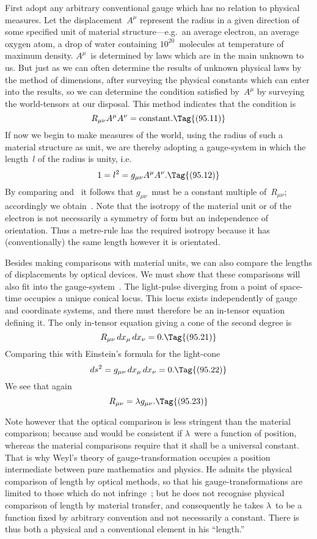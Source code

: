 \documentclass[12pt]{book}
\begin{document}
First adopt any arbitrary conventional gauge which has no relation to
%
%
physical measures. Let the displacement~$A^{\mu}$ represent the radius in a given
direction of some specified unit of material structure---e.g.\ an average electron,
an average oxygen atom, a drop of water containing $10^{20}$~molecules at temperature
of maximum density. $A^{\mu}$~is determined by laws which are in the main
unknown to us. But just as we can often determine the results of unknown
physical laws by the method of dimensions, after surveying the physical
constants which can enter into the results, so we can determine the condition
satisfied by~$A^{\mu}$ by surveying the world-tensors at our disposal. This method
indicates that the condition is
\[
R_{\mu\nu} A^{\mu} A^{\nu} = \text{constant}.
\Tag{(95.11)}
\]
If now we begin to make measures of the world, using the radius of such a
material structure as unit, we are thereby adopting a gauge-system in which
the length~$l$ of the radius is unity, i.e.\
\[
1 = l^{2} = g_{\mu\nu} A^{\mu} A^{\nu}.
\Tag{(95.12)}
\]
By comparing  and~ it follows that $g_{\mu\nu}$~must be a constant
multiple of~$R_{\mu\nu}$; accordingly we obtain~\Eq{(95.1)}\footnotemark.\footnotetext
  {Note that the isotropy of the material unit or of the electron is not necessarily a symmetry
  of form but an independence of orientation. Thus a metre-rule has the required isotropy because
  it has (conventionally) the same length however it is orientated.}

Besides making comparisons with material units, we can also compare the
lengths of displacements by optical devices. We must show that these comparisons
will also fit into the gauge-system~\Eq{(95.1)}. The light-pulse diverging
\index{Light-pulse!in-invariant equation}%
from a point of space-time occupies a unique conical locus. This locus exists
independently of gauge and coordinate systems, and there must therefore be
an in-tensor equation defining it. The only in-tensor equation giving a cone
of the second degree is
\[
R_{\mu\nu}\, dx_{\mu}\, dx_{\nu} = 0.
\Tag{(95.21)}
\]
Comparing this with Einstein's formula for the light-cone
\[
ds^{2} = g_{\mu\nu}\, dx_{\mu}\, dx_{\nu} = 0.
\Tag{(95.22)}
\]
We see that again
\[
R_{\mu\nu} = \lambda g_{\mu\nu}.
\Tag{(95.23)}
\]

Note however that the optical comparison is less stringent than the
material comparison; because \Eq{(95.21)} and \Eq{(95.22)} would be consistent if $\lambda$~were
a function of position, whereas the material comparisons require that it
shall be a universal constant. That is why Weyl's theory of gauge-transformation
occupies a position intermediate between pure mathematics and physics.
He admits the physical comparison of length by optical methods, so that his
gauge-transformations are limited to those which do not infringe~; but
he does not recognise physical comparison of length by material transfer, and
consequently he takes $\lambda$~to be a function fixed by arbitrary convention and
not necessarily a constant. There is thus both a physical and a conventional
element in his ``length.''
\end{document}
